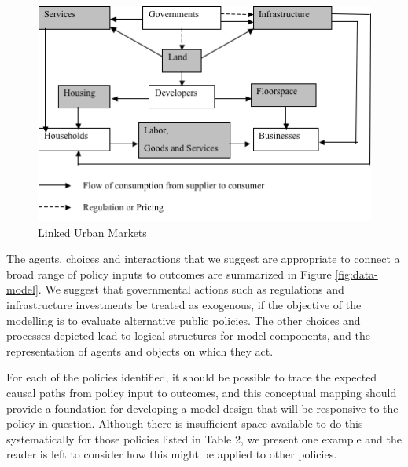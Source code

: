 \begin{figure}[htp]
\begin{center}
\includegraphics[scale=0.8]{graphics/markets.png}
\end{center}
\caption{\label{fig:markets}{Linked Urban Markets}}
\label{fig:markets}
\end{figure}

The agents, choices and interactions that we suggest are appropriate to connect a broad range of policy inputs to outcomes are summarized in Figure \ref{fig:data-model}.  We suggest that governmental actions such as regulations and infrastructure investments be treated as exogenous, if the objective of the modelling is to evaluate alternative public policies.  The other choices and processes depicted lead to logical structures for model components, and the representation of agents and objects on which they act.

For each of the policies identified, it should be possible to trace the expected causal paths from policy input to outcomes, and this conceptual mapping should provide a foundation for developing a model design that will be responsive to the policy in question.  Although there is insufficient space available to do this systematically for those policies listed in Table 2, we present one example and the reader is left to consider how this might be applied to other policies.

